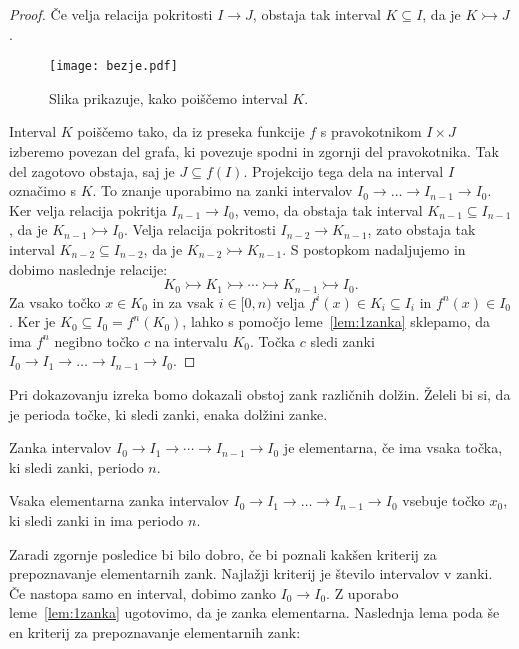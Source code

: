\documentclass[../TG_magistrsko_delo_sections.tex]{subfiles}
\begin{document}
\begin{proof}
Če velja relacija pokritosti $I \to J$, obstaja tak interval $K \subseteq I$, da je $K \rightarrowtail J$.
\begin{figure}[h]
  \centering
  \texttt{[image: bezje.pdf]}
  \caption[Primer vektorske slike.]{Slika prikazuje, kako poiščemo interval $K$.}
  \label{fig:bezje}
\end{figure}
Interval $K$ poiščemo tako, da iz preseka funkcije $f$ s pravokotnikom $I \times J$ izberemo povezan del grafa, ki povezuje spodni in zgornji del pravokotnika. Tak del zagotovo obstaja, saj je $J \subseteq f(I)$. Projekcijo tega dela na interval $I$ označimo s $K$. To znanje uporabimo na zanki intervalov $I_0 \to \dots \to I_{n-1} \to I_0$. Ker velja relacija pokritja $I_{n-1} \to I_0$, vemo, da obstaja tak interval $K_{n-1} \subseteq I_{n-1}$, da je $K_{n-1} \rightarrowtail I_0$. Velja relacija pokritosti $I_{n-2} \to K_{n-1}$, zato obstaja tak interval $K_{n-2} \subseteq I_{n-2}$, da je $K_{n-2} \rightarrowtail K_{n-1}$. S postopkom nadaljujemo in dobimo naslednje relacije:
$$K_0 \rightarrowtail K_1 \rightarrowtail \cdots \rightarrowtail K_{n-1} \rightarrowtail I_0.$$
Za vsako točko $x \in K_0$ in za vsak $i \in [0, n)$ velja $f^i(x) \in K_i \subseteq I_i$ in $f^n(x) \in I_0$. Ker je $K_0 \subseteq I_0 = f^n(K_0)$, lahko s pomočjo leme~\ref{lem:1zanka} sklepamo, da ima $f^n$ negibno točko $c$ na intervalu $K_0$. Točka $c$ sledi zanki $I_0 \to I_1 \to \dots \to I_{n-1} \to I_0$.
\end{proof}

Pri dokazovanju izreka bomo dokazali obstoj zank različnih dolžin. Želeli bi si, da je perioda točke, ki sledi zanki, enaka dolžini zanke. 

\begin{definicija}\label{def:element}
Zanka intervalov $I_0 \to I_1 \to \cdots \to I_{n-1} \to I_0$ je elementarna, če ima vsaka točka, ki sledi zanki, periodo $n$.
\end{definicija}

\begin{posledica}
Vsaka elementarna zanka intervalov $I_0 \to I_1 \to \dots \to I_{n-1} \to I_0$ vsebuje točko $x_0$, ki sledi zanki in ima periodo $n$.
\end{posledica}

Zaradi zgornje posledice bi bilo dobro, če bi poznali kakšen kriterij za prepoznavanje elementarnih zank. Najlažji kriterij je število intervalov v zanki. Če nastopa samo en interval, dobimo zanko $I_0 \to I_0$. Z uporabo leme~\ref{lem:1zanka} ugotovimo, da je zanka elementarna. Naslednja lema poda še en kriterij za prepoznavanje elementarnih zank:
\end{document}
